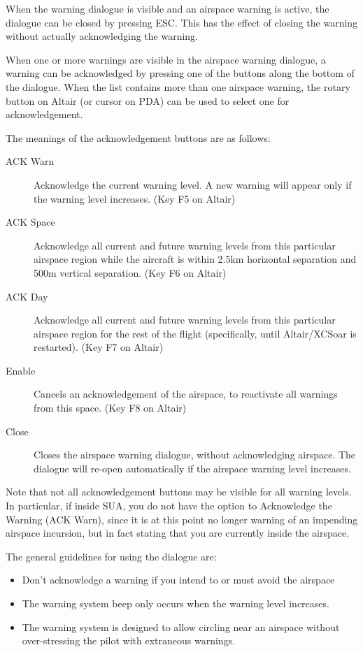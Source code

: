 When the warning dialogue is visible and an airspace warning is active, the
dialogue can be closed by pressing ESC.  This has the effect of closing the
warning without actually acknowledging the warning.

When one or more warnings are visible in the airspace warning dialogue,
a warning can be acknowledged by pressing one of the buttons along the bottom
of the dialogue.  When the list contains more than one airspace warning,
the rotary button on Altair (or cursor on PDA) can be used to select one
for acknowledgement.

The meanings of the acknowledgement buttons are as follows:
\begin{description}
\item[ACK Warn]  Acknowledge the current warning level.  A new warning will appear
only if the warning level increases.  (Key F5 on Altair)
\item[ACK Space]  Acknowledge all current and future warning levels from this 
particular airspace region while the aircraft is within 2.5km horizontal separation
and 500m vertical separation. (Key F6 on Altair)
\item[ACK Day]  Acknowledge all current and future warning levels from this particular
airspace region for the rest of the flight (specifically, until Altair/XCSoar 
is restarted). (Key F7 on Altair)
\item[Enable]  Cancels an acknowledgement of the airspace, to reactivate all warnings
from this space. (Key F8 on Altair)
\item[Close] Closes the airspace warning dialogue, without acknowledging airspace.
  The dialogue will re-open automatically if the airspace warning level increases.
\end{description}

Note that not all acknowledgement buttons may be visible for all
warning levels.  In particular, if inside SUA, you do not have the
option to Acknowledge the Warning (ACK Warn), since it is at this
point no longer warning of an impending airspace incursion, but in
fact stating that you are currently inside the airspace.

The general guidelines for using the dialogue are:
\begin{itemize}
\item  Don't acknowledge a warning if you intend to or must avoid the airspace
\item  The warning system beep only occurs when the warning level increases.
\item  The warning system is designed to allow circling near an airspace without
  over-stressing the pilot with extraneous warnings.
\end{itemize}

